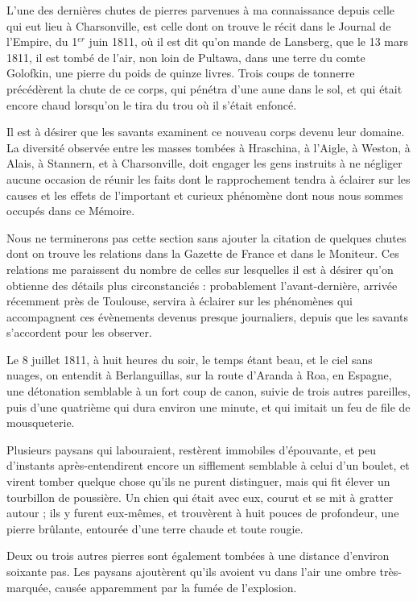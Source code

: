 \documentclass[a4paper, 12pt, oneside, french]{article}
\begin{document}
L'une des dernières chutes de pierres parvenues à ma connaissance depuis celle qui eut lieu à Charsonville, est celle dont on trouve le récit dans le Journal de l'Empire, du 1$^{er}$ juin 1811, où il est dit qu'on mande de Lansberg, que le 13 mars 1811, il est tombé de l'air, non loin de Pultawa, dans une terre du comte Golofkin, une pierre du poids de quinze livres. Trois coups de tonnerre précédèrent la chute de ce corps, qui pénétra d'une aune dans le sol, et qui était encore chaud lorsqu'on le tira du trou où il s'était enfoncé.

Il est à désirer que les savants examinent ce nouveau corps devenu leur domaine. La diversité observée entre les masses tombées à Hraschina, à l'Aigle, à Weston, à Alais, à Stannern, et à Charsonville, doit engager les gens instruits à ne négliger aucune occasion de réunir les faits dont le rapprochement tendra à éclairer sur les causes et les effets de l'important et curieux phénomène dont nous nous sommes occupés dans ce Mémoire.

Nous ne terminerons pas cette section sans ajouter la citation de quelques chutes dont on trouve les relations dans la Gazette de France et dans le Moniteur. Ces relations me paraissent du nombre de celles sur lesquelles il est à désirer qu'on obtienne des détails plus circonstanciés : probablement l'avant-dernière, arrivée récemment près de Toulouse, servira à éclairer sur les phénomènes qui accompagnent ces évènements devenus presque journaliers, depuis que les savants s'accordent pour les observer.

Le 8 juillet 1811, à huit heures du soir, le temps étant beau, et le ciel sans nuages, on entendit à Berlanguillas, sur la route d'Aranda à Roa, en Espagne, une détonation semblable à un fort coup de canon, suivie de trois autres pareilles, puis d'une quatrième qui dura environ une minute, et qui imitait un feu de file de mousqueterie.

Plusieurs paysans qui labouraient, restèrent immobiles d'épouvante, et peu d'instants après-entendirent encore un sifflement semblable à celui d'un boulet, et virent tomber quelque chose qu'ils ne purent distinguer, mais qui fit élever un tourbillon de poussière. Un chien qui était avec eux, courut et se mit à gratter autour ; ils y furent eux-mêmes, et trouvèrent à huit pouces de profondeur, une pierre brûlante, entourée d'une terre chaude et toute rougie.

Deux ou trois autres pierres sont également tombées à une distance d'environ soixante pas. Les paysans ajoutèrent qu'ils avoient vu dans l'air une ombre très-marquée, causée apparemment par la fumée de l'explosion.
\end{document}
